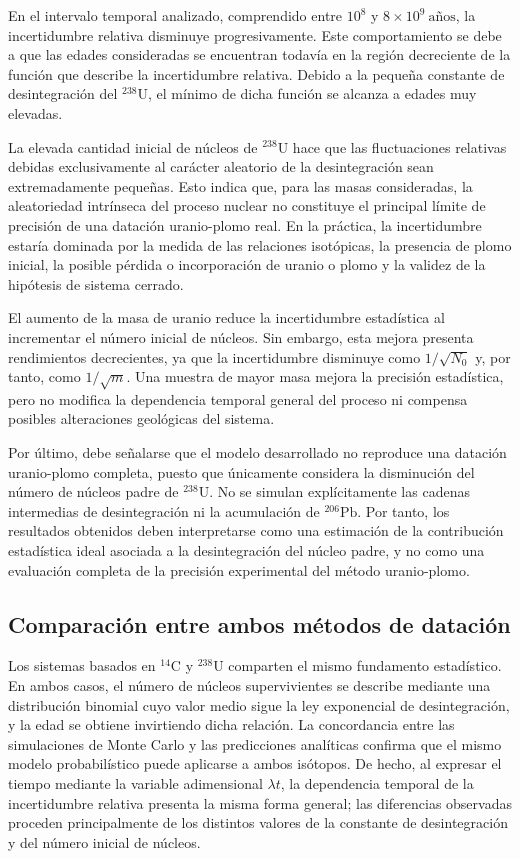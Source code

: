 \documentclass[12pt,a4paper]{article}
\begin{document}
En el intervalo temporal analizado, comprendido entre $10^8$ y $8\times10^9\ \text{años}$, la incertidumbre relativa disminuye progresivamente. Este comportamiento se debe a que las edades consideradas se encuentran todavía en la región decreciente de la función que describe la incertidumbre relativa. Debido a la pequeña constante de desintegración del $^{238}\text{U}$, el mínimo de dicha función se alcanza a edades muy elevadas.

La elevada cantidad inicial de núcleos de $^{238}\text{U}$ hace que las fluctuaciones relativas debidas exclusivamente al carácter aleatorio de la desintegración sean extremadamente pequeñas. Esto indica que, para las masas consideradas, la aleatoriedad intrínseca del proceso nuclear no constituye el principal límite de precisión de una datación uranio-plomo real. En la práctica, la incertidumbre estaría dominada por la medida de las relaciones isotópicas, la presencia de plomo inicial, la posible pérdida o incorporación de uranio o plomo y la validez de la hipótesis de sistema cerrado.

El aumento de la masa de uranio reduce la incertidumbre estadística al incrementar el número inicial de núcleos. Sin embargo, esta mejora presenta rendimientos decrecientes, ya que la incertidumbre disminuye como $1/\sqrt{N_0}$ y, por tanto, como $1/\sqrt{m}$. Una muestra de mayor masa mejora la precisión estadística, pero no modifica la dependencia temporal general del proceso ni compensa posibles alteraciones geológicas del sistema.

Por último, debe señalarse que el modelo desarrollado no reproduce una datación uranio-plomo completa, puesto que únicamente considera la disminución del número de núcleos padre de $^{238}\text{U}$. No se simulan explícitamente las cadenas intermedias de desintegración ni la acumulación de $^{206}\text{Pb}$. Por tanto, los resultados obtenidos deben interpretarse como una estimación de la contribución estadística ideal asociada a la desintegración del núcleo padre, y no como una evaluación completa de la precisión experimental del método uranio-plomo.


\subsection{Comparación entre ambos métodos de datación}

Los sistemas basados en $^{14}\text{C}$ y $^{238}\text{U}$ comparten el mismo fundamento estadístico. En ambos casos, el número de núcleos supervivientes se describe mediante una distribución binomial cuyo valor medio sigue la ley exponencial de desintegración, y la edad se obtiene invirtiendo dicha relación. La concordancia entre las simulaciones de Monte Carlo y las predicciones analíticas confirma que el mismo modelo probabilístico puede aplicarse a ambos isótopos. De hecho, al expresar el tiempo mediante la variable adimensional $\lambda t$, la dependencia temporal de la incertidumbre relativa presenta la misma forma general; las diferencias observadas proceden principalmente de los distintos valores de la constante de desintegración y del número inicial de núcleos.
\end{document}
